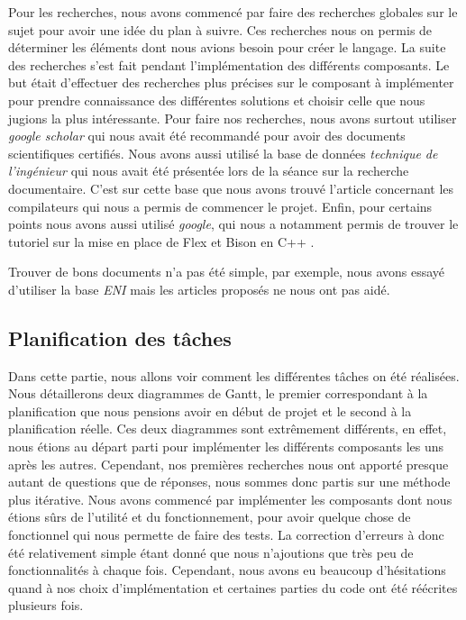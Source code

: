\documentclass[a4paper]{article}%
\begin{document}
Pour les recherches, nous avons commencé par faire des recherches globales sur
le sujet pour avoir une idée du plan à suivre. Ces recherches nous on permis de
déterminer les éléments dont nous avions besoin pour créer le langage. La suite
des recherches s'est fait pendant l'implémentation des différents composants. Le
but était d'effectuer des recherches plus précises sur le composant à
implémenter pour prendre connaissance des différentes solutions et choisir
celle que nous jugions la plus intéressante. Pour faire nos recherches, nous
avons surtout utiliser \textit{google scholar} qui nous avait été recommandé
pour avoir des documents scientifiques certifiés. Nous avons aussi utilisé la
base de données \textit{technique de l'ingénieur} qui nous avait été présentée
lors de la séance sur la recherche documentaire. C'est sur cette base que nous
avons trouvé l'article concernant les compilateurs \cite{compilerTICH} qui nous
a permis de commencer le projet. Enfin, pour certains points nous avons aussi
utilisé \textit{google}, qui nous a notamment permis de trouver le tutoriel sur
la mise en place de Flex et Bison en C++ \cite{cppparsing}.

Trouver de bons documents n'a pas été simple, par exemple, nous avons essayé
d'utiliser la base \textit{ENI} mais les articles proposés ne nous ont pas aidé.

\clearpage
\subsection{Planification des tâches}

Dans cette partie, nous allons voir comment les différentes tâches on été
réalisées. Nous détaillerons deux diagrammes de Gantt, le premier correspondant
à la planification que nous pensions avoir en début de projet et le second à la
planification réelle. Ces deux diagrammes sont extrêmement différents, en effet,
nous étions au départ parti pour implémenter les différents composants les uns
après les autres. Cependant, nos premières recherches nous ont apporté presque
autant de questions que de réponses, nous sommes donc partis sur une méthode plus
itérative. Nous avons commencé par implémenter les composants dont nous étions
sûrs de l'utilité et du fonctionnement, pour avoir quelque chose de fonctionnel
qui nous permette de faire des tests. La correction d'erreurs à donc été
relativement simple étant donné que nous n'ajoutions que très peu de
fonctionnalités à chaque fois. Cependant, nous avons eu beaucoup d'hésitations
quand à nos choix d'implémentation et certaines parties du code ont été
réécrites plusieurs fois.\\
\end{document}
